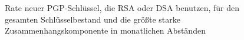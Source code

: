 \begin{figure}[th!]
  \centering
  \caption{Rate neuer PGP-Schlüssel, die RSA oder DSA benutzen,
    für den gesamten Schlüsselbestand  und
    die größte starke Zusammenhangskomponente
     in monatlichen Abständen}
  \label{fig:pkalg}
\end{figure}

